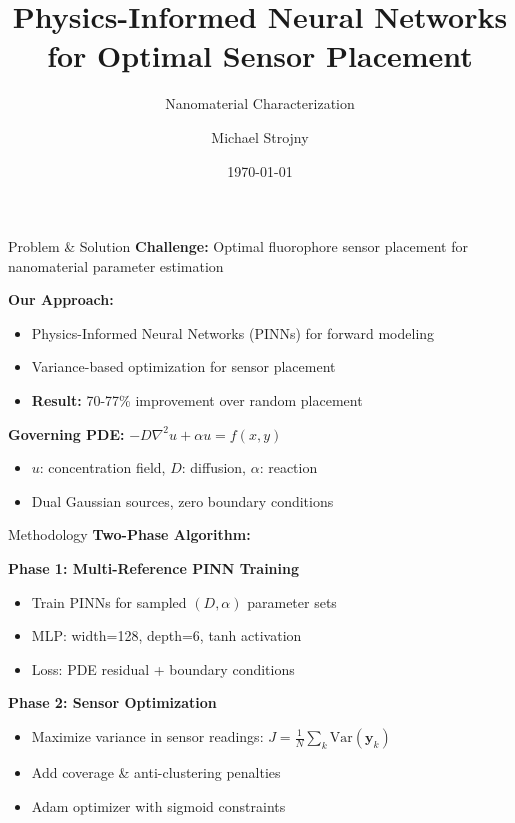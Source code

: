 \documentclass[aspectratio=169]{beamer}
\title{Physics-Informed Neural Networks for Optimal Sensor Placement}
\subtitle{Nanomaterial Characterization}
\author{Michael Strojny}
\date{\today}
\begin{document}
\frame{\titlepage}

\begin{frame}{Problem \& Solution}
\textbf{Challenge:} Optimal fluorophore sensor placement for nanomaterial parameter estimation

\vspace{0.3cm}
\textbf{Our Approach:}
\begin{itemize}
    \item Physics-Informed Neural Networks (PINNs) for forward modeling
    \item Variance-based optimization for sensor placement
    \item \textbf{Result:} 70-77\% improvement over random placement
\end{itemize}

\vspace{0.3cm}
\textbf{Governing PDE:} $-D \nabla^2 u + \alpha u = f(x,y)$
\begin{itemize}
    \item $u$: concentration field, $D$: diffusion, $\alpha$: reaction
    \item Dual Gaussian sources, zero boundary conditions
\end{itemize}
\end{frame}

\begin{frame}{Methodology}
\textbf{Two-Phase Algorithm:}

\textbf{Phase 1: Multi-Reference PINN Training}
\begin{itemize}
    \item Train PINNs for sampled $(D, \alpha)$ parameter sets
    \item MLP: width=128, depth=6, tanh activation
    \item Loss: PDE residual + boundary conditions
\end{itemize}

\textbf{Phase 2: Sensor Optimization}
\begin{itemize}
    \item Maximize variance in sensor readings: $J = \frac{1}{N}\sum_k \text{Var}(\mathbf{y}_k)$
    \item Add coverage \& anti-clustering penalties
    \item Adam optimizer with sigmoid constraints
\end{itemize}
\end{frame}
\end{document}
